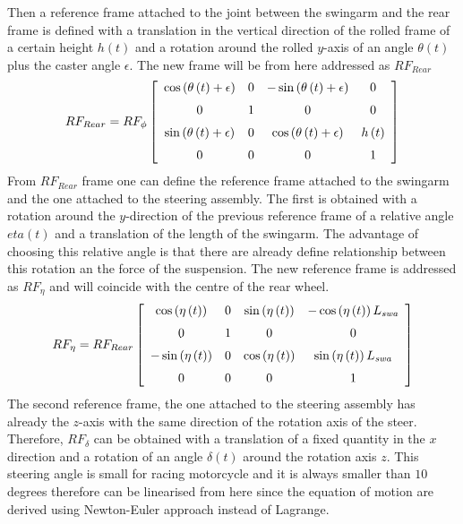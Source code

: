 Then a reference frame attached to the joint between the swingarm and the rear frame is defined with a translation in the vertical direction of the rolled frame of a certain height $h(t)$ and a rotation around the rolled $y$-axis of an angle $\theta(t)$ plus the caster angle $\epsilon$. The new frame will be from here addressed as $RF_{Rear}$
\begin{equation}
    RF_{Rear} = RF_\phi 
    \left[ \begin {array}{cccc} \cos \left( \theta \left( t \right) +
    \epsilon \right) &0&-\sin \left( \theta \left( t \right) +\epsilon
    \right) &0\\ \noalign{\medskip}0&1&0&0\\ \noalign{\medskip}\sin
    \left( \theta \left( t \right) +\epsilon \right) &0&\cos \left( 
    \theta \left( t \right) +\epsilon \right) &h \left( t \right) 
    \\ \noalign{\medskip}0&0&0&1\end {array} \right] 
\end{equation}
From $RF_{Rear}$ frame one can define the reference frame attached to the swingarm and the one attached to the steering assembly. The first is obtained with a rotation around the $y$-direction of the previous reference frame of a relative angle $eta(t)$ and a translation of the length of the swingarm. The advantage of choosing this relative angle is that there are already define relationship between this rotation an the force of the suspension. The new reference frame is addressed as $RF_\eta$ and will coincide with the centre of the rear wheel.
\begin{equation}
    RF_{\eta} = RF_{Rear} 
    \left[ \begin {array}{cccc} \cos \left( \eta \left( t \right) 
    \right) &0&\sin \left( \eta \left( t \right)  \right) &-\cos \left( 
    \eta \left( t \right)  \right) L_{{\it swa}}\\ \noalign{\medskip}0&1&0
    &0\\ \noalign{\medskip}-\sin \left( \eta \left( t \right)  \right) &0&
    \cos \left( \eta \left( t \right)  \right) &\sin \left( \eta \left( t
    \right)  \right) L_{{\it swa}}\\ \noalign{\medskip}0&0&0&1
    \end {array} \right]
\end{equation}
The second reference frame, the one attached to the steering assembly has already the $z$-axis with the same direction of the rotation axis of the steer. Therefore, $RF_\delta$ can be obtained with a translation of a fixed quantity in the $x$ direction and a rotation of an angle $\delta(t)$ around the rotation axis $z$. This steering angle is small for racing motorcycle and it is always smaller than $10$ degrees therefore can be linearised from here since the equation of motion are derived using Newton-Euler approach instead of Lagrange.
